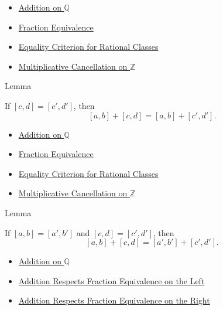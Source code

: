 \begin{dependencies}
\begin{itemize}
  \item \hyperref[def:addition-on-q-classes]{Addition on $\mathbb{Q}$}
  \item \hyperref[def:fraction-equivalence]{Fraction Equivalence}
  \item \hyperref[prop:equality-criterion-for-rational-classes]{Equality Criterion for Rational Classes}
  \item \hyperref[cor:multiplicative-cancellation-on-z]{Multiplicative Cancellation on $\mathbb{Z}$}
\end{itemize}
\end{dependencies}

\begin{lemmabox}{Lemma}
\begin{lemma}
\label{lem:addition-on-q-respects-right-equivalence}
If $[c,d]=[c',d']$, then
\[
[a,b]+[c,d]=[a,b]+[c',d'].
\]
\end{lemma}
\end{lemmabox}

\begin{dependencies}
\begin{itemize}
  \item \hyperref[def:addition-on-q-classes]{Addition on $\mathbb{Q}$}
  \item \hyperref[def:fraction-equivalence]{Fraction Equivalence}
  \item \hyperref[prop:equality-criterion-for-rational-classes]{Equality Criterion for Rational Classes}
  \item \hyperref[cor:multiplicative-cancellation-on-z]{Multiplicative Cancellation on $\mathbb{Z}$}
\end{itemize}
\end{dependencies}

\begin{lemmabox}{Lemma}
\begin{lemma}
\label{lem:addition-on-q-respects-equivalence}
If $[a,b]=[a',b']$ and $[c,d]=[c',d']$, then
\[
[a,b]+[c,d]=[a',b']+[c',d'].
\]
\end{lemma}
\end{lemmabox}

\begin{dependencies}
\begin{itemize}
  \item \hyperref[def:addition-on-q-classes]{Addition on $\mathbb{Q}$}
  \item \hyperref[lem:addition-on-q-respects-left-equivalence]{Addition Respects Fraction Equivalence on the Left}
  \item \hyperref[lem:addition-on-q-respects-right-equivalence]{Addition Respects Fraction Equivalence on the Right}
\end{itemize}
\end{dependencies}

